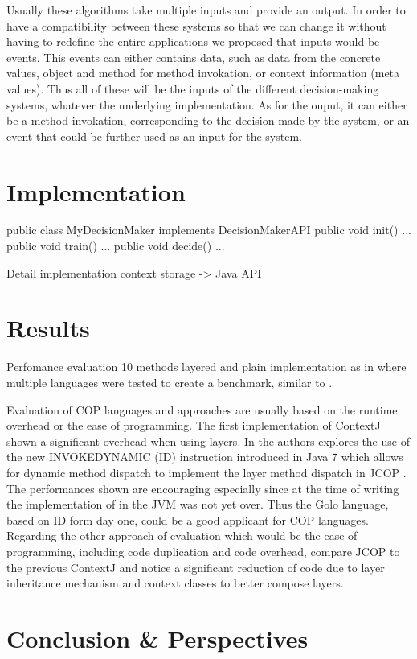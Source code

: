 \documentclass[a4paper]{article}
\begin{document}
Usually these algorithms take multiple inputs and provide an output. In order to have a compatibility between these systems so that we can change it without having to redefine the entire applications we proposed that inputs would be events. This events can either contains data, such as data from the concrete values, object and method for method invokation, or context information (meta values). Thus all of these will be the inputs of the different decision-making systems, whatever the underlying implementation. As for the ouput, it can either be a method invokation, corresponding to the decision made by the system, or an event that could be further used as an input for the system.

\section{Implementation}
\label{section:implementation}
public class MyDecisionMaker implements DecisionMakerAPI {
  public void init() { ... }
  public void train() { ... }
  public void decide() { ... }
}

Detail implementation
context storage -> Java API

\section{Results}
\label{section:results}

Perfomance evaluation
10 methods layered and plain implementation as in \cite{appeltauer_comparison_2009} where multiple languages were tested to create a benchmark, similar to \cite{kamina_eventcj:_2011}.

Evaluation of COP languages and approaches are usually based on the runtime overhead or the ease of programming. The first implementation of ContextJ \cite{haupt_contextj:_2011} shown a significant overhead when using layers. In \cite{appeltauer_layered_2010} the authors explores the use of the new INVOKEDYNAMIC (ID) instruction introduced in Java 7 which allows for dynamic method dispatch to implement the layer method dispatch in JCOP \cite{appeltauer_declarative_2013}. The performances shown are encouraging especially since at the time of writing the implementation of in the JVM was not yet over. Thus the Golo language, based on ID form day one, could be a good applicant for COP languages. Regarding the other approach of evaluation which would be the ease of programming, including code duplication and code overhead, \cite{appeltauer_declarative_2013} compare JCOP to the previous ContextJ and notice a significant reduction of code due to layer inheritance mechanism and context classes to better compose layers.

\section{Conclusion \& Perspectives}
\label{section:conclusion}


%
%



\end{document}
